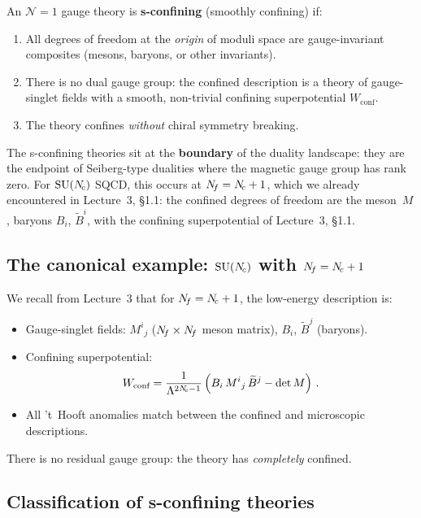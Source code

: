 \documentclass[11pt,a4paper]{article}
\begin{document}
An $\mathcal{N}=1$ gauge theory is \textbf{s-confining} (smoothly
confining) if:
\begin{enumerate}
  \item All degrees of freedom at the \emph{origin} of moduli space
    are gauge-invariant composites (mesons, baryons, or other
    invariants).
  \item There is no dual gauge group: the confined description is a
    theory of gauge-singlet fields with a smooth, non-trivial
    confining superpotential $W_{\text{conf}}$.
  \item The theory confines \emph{without} chiral symmetry breaking.
\end{enumerate}

The s-confining theories sit at the \textbf{boundary} of the duality
landscape: they are the endpoint of Seiberg-type dualities where the
magnetic gauge group has rank zero.  For $\mathrm{SU}(N_{\!c})$ SQCD, this
occurs at $N_{\!f} = N_{\!c} + 1$, which we already encountered in
Lecture~3, \S1.1: the confined degrees of freedom are the
meson~$M$, baryons $B_i$, $\widetilde{B}^i$, with the confining
superpotential of Lecture~3, \S1.1.

\subsection{The canonical example: $\mathrm{SU}(N_{\!c})$ with $N_{\!f} = N_{\!c} + 1$}

We recall from Lecture~3 that for $N_{\!f} = N_{\!c} + 1$, the low-energy
description is:
\begin{itemize}
  \item Gauge-singlet fields: $M^i{}_j$ ($N_{\!f} \times N_{\!f}$
    meson matrix), $B_i$, $\widetilde{B}^j$ (baryons).
  \item Confining superpotential:
    \[
      W_{\text{conf}} = \frac{1}{\Lambda^{2N_{\!c} - 1}}
      \left(B_i\, M^i{}_j\, \widetilde{B}^j - \det M\right)\,.
    \]
  \item All 't~Hooft anomalies match between the confined and
    microscopic descriptions.
\end{itemize}
There is no residual gauge group: the theory has \emph{completely}
confined.

\subsection{Classification of s-confining theories}
\end{document}
